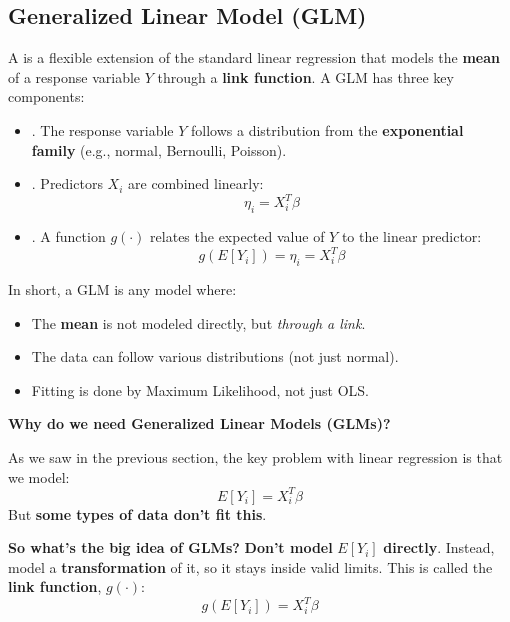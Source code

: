 \subsection{Generalized Linear Model (GLM)}

A  is a flexible extension of the standard linear regression that models the \textbf{mean} of a response variable $Y$ through a \textbf{link function}. A GLM has three key components:
\begin{itemize}
    \item {}. The response variable $Y$ follows a distribution from the \textbf{exponential family} (e.g., normal, Bernoulli, Poisson).
    \item {}. Predictors $X_i$ are combined linearly:
    \begin{equation*}
        \eta_i = X_i^T \beta
    \end{equation*}
    \item {}. A function $g(\cdot)$ relates the expected value of $Y$ to the linear predictor:
    \begin{equation*}
        g(E[Y_i]) = \eta_i = X_i^T \beta
    \end{equation*}
\end{itemize}
In short, a GLM is any model where:
\begin{itemize}
    \item The \textbf{mean} is not modeled directly, but \emph{through a link}.
    \item The data can follow various distributions (not just normal).
    \item Fitting is done by Maximum Likelihood, not just OLS.
\end{itemize}

\highspace
\begin{flushleft}
    \textcolor{Green3}{ \textbf{Why do we need Generalized Linear Models (GLMs)?}}
\end{flushleft}
As we saw in the previous section, the key problem with linear regression is that we model:
\begin{equation*}
    E[Y_i] = X_i^T \beta
\end{equation*}
But \textbf{some types of data don't fit this}.

\highspace
\textcolor{Green3}{ \textbf{So what's the big idea of GLMs?}} \textbf{Don't model} $E[Y_i]$ \textbf{directly}. Instead, model a \textbf{transformation} of it, so it stays inside valid limits. This is called the \textbf{link function}, $g\left(\cdot\right)$:
\begin{equation*}
    g(E[Y_i]) = X_i^T \beta
\end{equation*}

